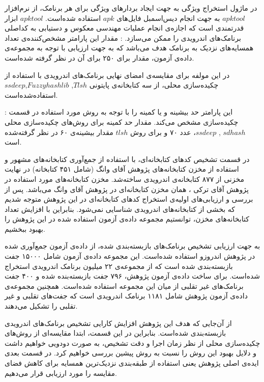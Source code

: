 در ماژول استخراج ویژگی به جهت ایجاد بردار‌های ویژگی برای هر برنامک، از نرم‌افزار $apktool$ به جهت انجام دیس‌اسمبل فایل‌های $apk$ استفاده شده‌است. $apktool$ ابزار قدرتمندی است که اجازه‌ی انجام عملیات مهندسی معکوس و دستیابی به کداصلی برنامک‌های اندرویدی را ممکن می‌سازد.
: مقدار این پارامتر مشخص‌کننده‌ی تعداد همسایه‌های نزدیک به برنامک هدف می‌باشد که به جهت ارزیابی با توجه به مجموعه‌‌ی داده‌ی آزمون، مقدار برای ۲۵۰ برای آن در نظر گرفته شده‌‌است.


در این مولفه برای مقایسه‌ی امضای نهایی برنامک‌های اندرویدی با استفاده از چکیده‌سازی محلی، از سه کتابخانه‌ی پایتونی $Tlsh$, $Fuzzyhashlib$,$ssdeep$ استفاده‌شده‌است. 

: این پارامتر حد بیشینه و یا کمینه را با توجه به روش مورد استفاده‌ در قسمت چکیده‌سازی مشخص می‌کند. مقدار حد کمینه برای روش‌های چکیده‌سازی محلی $sdhash$ , $ssdeep$، عدد ۷۰ و برای روش $tlsh$ مقدار بیشینه‌ی ۶۰ در نظر گرفته‌شده است.



در قسمت تشخیص کد‌های کتابخانه‌ای، با استفاده از جمع‌آوری کتابخانه‌های مشهور و استفاده از مخزن کتابخانه‌های پژوهش آقای وانگ (شامل ۴۵۱ کتابخانه) در نهایت مخزنی از ۸۷۷ کتابخانه‌ی اندرویدی ساخته‌شد. مخزن کتابخانه‌های مورد استفاده در پژوهش آقای ترکی ، همان مخزن کتابخانه‌ای در پژوهش آقای وانگ می‌باشد. پس از بررسی و ارزیابی‌های اولیه‌ی استخراج کد‌های کتابخانه‌ای در این پژوهش متوجه شدیم که بخشی از کتابخانه‌های اندرویدی شناسایی نمی‌شود. بنابراین با افزایش تعداد کتابخانه‌های مخزن، توانستیم مجموعه‌ داده‌ی آزمون استفاده شده در این پژوهش را بهبود ببخشیم.

به جهت ارزیابی تشخیص برنامک‌های بازبسته‌بندی شده، از داده‌ی آزمون جمع‌آوری شده در پژوهش اندروزو استفاده شده‌است. این مجموعه‌ داده‌‌ی آزمون شامل ۱۵۰۰۰ جفت بازبسته‌بندی شده است که از مجموعه‌ی ۲۲ میلیون برنامک اندرویدی استخراج شده‌است. برای ساخت داده‌ی آزمون پژوهش، ۷۹۶ جفت بازبسته‌بنده شده و ۴۰۰ جفت برنامک‌های غیر تقلبی از میان این مجموعه استفاده شده‌است. همچنین مجموعه‌ی داده‌ی آزمون پژوهش شامل ۱۱۸۱ برنامک اندرویدی است که جفت‌های تقلبی و غیر تقلبی را تشکیل می‌دهند.


از آن‌جایی که هدف این پژوهش افزایش کارایی تشخیص برنامک‌های اندرویدی بازبسته‌بندی شده‌است. بنابراین در این قسمت، ابتدا مقایسه‌ای از روش‌های چکیده‌سازی محلی از نظر زمان اجرا و دقت تشخیص، به صورت دودویی خواهیم داشت و دلایل بهبود این روش را نسبت به روش پیشین بررسی خواهیم کرد. در قسمت بعدی ایده‌ی اصلی پژوهش یعنی استفاده از طبقه‌بندی نزدیک‌ترین همسایه برای کاهش فضای مقایسه‌ را مورد ارزیابی قرار می‌دهیم.

